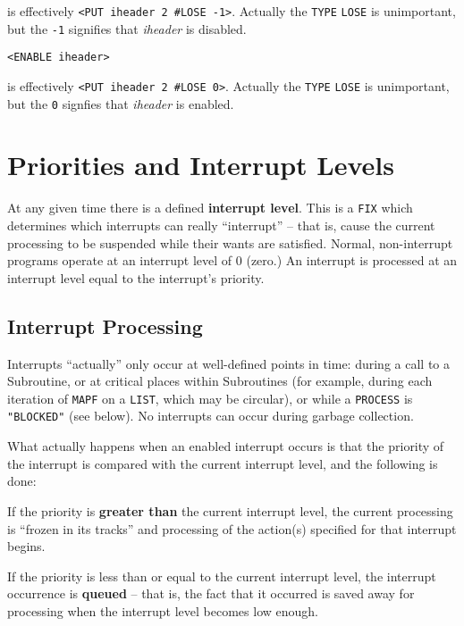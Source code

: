 \documentclass[a4paper]{scrbook}
\begin{document}
 is effectively \texttt{\textless{}PUT\ iheader\ 2\ \#LOSE\ -1\textgreater{}}. Actually the
\texttt{TYPE} \texttt{LOSE} is unimportant, but the \texttt{-1} signifies that \emph{iheader} is disabled.

\begin{verbatim}
<ENABLE iheader>
\end{verbatim}

 is effectively \texttt{\textless{}PUT\ iheader\ 2\ \#LOSE\ 0\textgreater{}}. Actually the
\texttt{TYPE} \texttt{LOSE} is unimportant, but the \texttt{0} signfies that \emph{iheader} is enabled.

\section{Priorities and Interrupt Levels}\label{priorities-and-interrupt-levels}

At any given time there is a defined \textbf{interrupt level}. This is a \texttt{FIX} which determines which interrupts can
really ``interrupt'' -- that is, cause the current processing to be suspended while their wants are satisfied. Normal,
non-interrupt programs operate at an interrupt level of 0 (zero.) An interrupt is processed at an interrupt level equal to
the interrupt's priority.

\subsection{Interrupt Processing}\label{interrupt-processing}

Interrupts ``actually'' only occur at well-defined points in time: during a call to a Subroutine, or at critical places
within Subroutines (for example, during each iteration of \texttt{MAPF} on a \texttt{LIST}, which may be circular), or
while a \texttt{PROCESS} is \texttt{"BLOCKED"}  (see below). No interrupts can occur during
garbage collection.

What actually happens when an enabled interrupt occurs is that the priority of the interrupt is compared with the current
interrupt level, and the following is done:

If the priority is \textbf{greater than} the current interrupt level, the current processing is ``frozen in its tracks''
and processing of the action(s) specified for that interrupt begins.

If the priority is less than or equal to the current interrupt level, the interrupt occurrence is \textbf{queued} -- that
is, the fact that it occurred is saved away for processing when the interrupt level becomes low enough.
\end{document}
